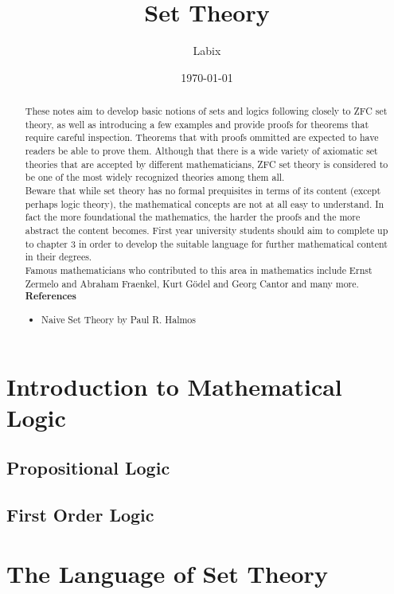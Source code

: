 \documentclass[a4paper]{article}
\title{Set Theory}
\author{Labix}
\date{\today}
\begin{document}
\maketitle
\begin{abstract}
These notes aim to develop basic notions of sets and logics following closely to ZFC set theory, as well as introducing a few examples and provide proofs for theorems that require careful inspection. Theorems that with proofs ommitted are expected to have readers be able to prove them. Although that there is a wide variety of axiomatic set theories that are accepted by different mathematicians, ZFC set theory is considered to be one of the most widely recognized theories among them all. \\

Beware that while set theory has no formal prequisites in terms of its content (except perhaps logic theory), the mathematical concepts are not at all easy to understand. In fact the more foundational the mathematics, the harder the proofs and the more abstract the content becomes. First year university students should aim to complete up to chapter $3$ in order to develop the suitable language for further mathematical content in their degrees. \\

Famous mathematicians who contributed to this area in mathematics include Ernst Zermelo and Abraham Fraenkel, Kurt Gödel and Georg Cantor and many more. \\
\textbf{References}
\begin{itemize}
\item Naive Set Theory by Paul R. Halmos
\end{itemize}
\end{abstract}
\pagebreak
\tableofcontents
\pagebreak

\pagebreak
\section{Introduction to Mathematical Logic}
\subsection{Propositional Logic}

\subsection{First Order Logic}

\pagebreak
\section{The Language of Set Theory}
\end{document}
